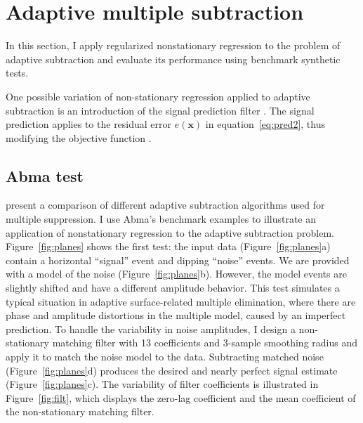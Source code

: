 \section{Adaptive multiple subtraction}

In this section, I apply regularized nonstationary regression to the
problem of adaptive subtraction and evaluate its performance using
benchmark synthetic tests. 

One possible variation of non-stationary regression applied to
adaptive subtraction is an introduction of the signal prediction
filter \cite[]{TLE18-01-00550058}. The signal prediction applies to
the residual error $e(\mathbf{x})$ in equation~\ref{eq:pred2}, thus
modifying the objective function \cite[]{GEO70-04-V97V107}.

\subsection{Abma test}

\cite{TLE24-03-02770280} present a comparison of different adaptive
subtraction algorithms used for multiple suppression. I use Abma's
benchmark examples to illustrate an application of nonstationary
regression to the adaptive subtraction problem.
Figure~\ref{fig:planes} shows the first test: the input data
(Figure~\ref{fig:planes}a) contain a horizontal ``signal'' event and
dipping ``noise'' events. We are provided with a model of the noise
(Figure~\ref{fig:planes}b). However, the model events are slightly
shifted and have a different amplitude behavior. This test simulates a
typical situation in adaptive surface-related multiple elimination,
where there are phase and amplitude distortions in the multiple model,
caused by an imperfect prediction. To handle the variability in noise
amplitudes, I design a non-stationary matching filter with 13
coefficients and 3-sample smoothing radius and apply it to match the
noise model to the data. Subtracting matched noise
(Figure~\ref{fig:planes}d) produces the desired and nearly perfect
signal estimate (Figure~\ref{fig:planes}c). The variability of filter
coefficients is illustrated in Figure~\ref{fig:filt}, which displays
the zero-lag coefficient and the mean coefficient of the
non-stationary matching filter.


